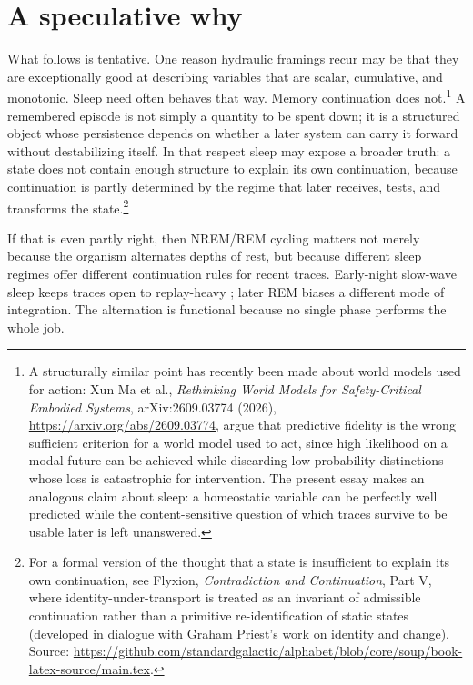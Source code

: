 \documentclass[11pt]{article}
\begin{document}
\section{A speculative why}
What follows is tentative. One reason hydraulic framings recur may be that they are exceptionally good at describing variables that are scalar, cumulative, and monotonic. Sleep need often behaves that way. Memory continuation does not.\footnote{A structurally similar point has recently been made about world models used for action: Xun Ma et al., \emph{Rethinking World Models for Safety-Critical Embodied Systems}, arXiv:2609.03774 (2026), \url{https://arxiv.org/abs/2609.03774}, argue that predictive fidelity is the wrong sufficient criterion for a world model used to act, since high likelihood on a modal future can be achieved while discarding low-probability distinctions whose loss is catastrophic for intervention. The present essay makes an analogous claim about sleep: a homeostatic variable can be perfectly well predicted while the content-sensitive question of which traces survive to be usable later is left unanswered.} A remembered episode is not simply a quantity to be spent down; it is a structured object whose persistence depends on whether a later system can carry it forward without destabilizing itself. In that respect sleep may expose a broader truth: a state does not contain enough structure to explain its own continuation, because continuation is partly determined by the regime that later receives, tests, and transforms the state.\footnote{For a formal version of the thought that a state is insufficient to explain its own continuation, see Flyxion, \emph{Contradiction and Continuation}, Part V, where identity-under-transport is treated as an invariant of admissible continuation rather than a primitive re-identification of static states (developed in dialogue with Graham Priest's work on identity and change). Source: \url{https://github.com/standardgalactic/alphabet/blob/core/soup/book-latex-source/main.tex}.}

If that is even partly right, then NREM/REM cycling matters not merely because the organism alternates depths of rest, but because different sleep regimes offer different continuation rules for recent traces. Early-night slow-wave sleep keeps traces open to replay-heavy \repair; later REM biases a different mode of integration. The alternation is functional because no single phase performs the whole job.
\end{document}
